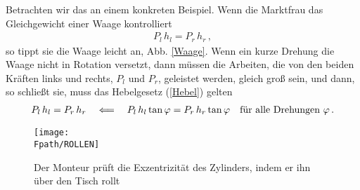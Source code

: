 Betrachten wir das an einem konkreten Beispiel. Wenn die Marktfrau das Gleichgewicht
einer Waage kontrolliert
\begin{align} \label {Hebel}
P_l \,h_l = P_r \, h_r\,,
\end{align}
so tippt sie die Waage leicht an, Abb. \ref{Waage}. Wenn ein kurze Drehung die Waage nicht in Rotation versetzt, dann m\"{u}ssen die Arbeiten, die von den beiden Kr\"{a}ften links und rechts, $P_l$ und $P_r$, geleistet werden, gleich gro{\ss} sein, und dann, so schlie{\ss}t sie, muss das Hebelgesetz (\ref{Hebel}) gelten
\begin{align}
 P_l \,h_l = P_r \, h_r \quad
\Longleftarrow \quad P_l \,h_l \tan \varphi = P_r \,h_r \tan \varphi \quad \mbox{f\"{u}r alle
Drehungen $ \varphi$}\,.
\end{align}
\begin{figure}[tbp]
\if {} \sidecaption \fi
\texttt{[image: \\Fpath/ROLLEN]}
\caption{Der Monteur pr\"{u}ft die Exzentrizit\"{a}t des Zylinders, indem er ihn \"{u}ber den Tisch rollt} \label{Rollen}
\end{figure}%

